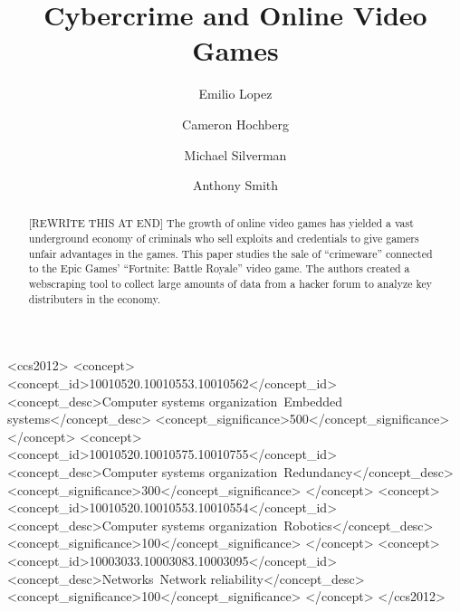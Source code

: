 \documentclass[sigconf]{acmart}
\begin{document}
\title{Cybercrime and Online Video Games}

\author{Emilio Lopez}

\author{Cameron Hochberg}

\author{Michael Silverman}

\author{Anthony Smith}

\renewcommand{\shortauthors}{Lopez, Hochberg, Silverman and Smith}

\begin{abstract}
  [REWRITE THIS AT END]
  The growth of online video games has yielded a vast underground economy of
  criminals who sell exploits and credentials to give gamers unfair advantages
  in the games. This paper studies the sale of ``crimeware'' connected to
  the Epic Games' ``Fortnite: Battle Royale'' video game. The authors created 
  a webscraping tool to collect large amounts of data from a hacker forum to 
  analyze key distributers in the economy.
\end{abstract}

\begin{CCSXML}
<ccs2012>
 <concept>
  <concept_id>10010520.10010553.10010562</concept_id>
  <concept_desc>Computer systems organization~Embedded systems</concept_desc>
  <concept_significance>500</concept_significance>
 </concept>
 <concept>
  <concept_id>10010520.10010575.10010755</concept_id>
  <concept_desc>Computer systems organization~Redundancy</concept_desc>
  <concept_significance>300</concept_significance>
 </concept>
 <concept>
  <concept_id>10010520.10010553.10010554</concept_id>
  <concept_desc>Computer systems organization~Robotics</concept_desc>
  <concept_significance>100</concept_significance>
 </concept>
 <concept>
  <concept_id>10003033.10003083.10003095</concept_id>
  <concept_desc>Networks~Network reliability</concept_desc>
  <concept_significance>100</concept_significance>
 </concept>
</ccs2012>
\end{CCSXML}
\end{document}

